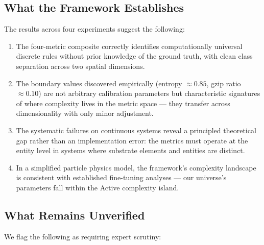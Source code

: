 \documentclass[12pt,a4paper]{article}
\begin{document}
\subsection{What the Framework Establishes}

The results across four experiments suggest the following:

\begin{enumerate}[noitemsep]
  \item The four-metric composite correctly identifies computationally
    universal discrete rules without prior knowledge of the ground truth,
    with clean class separation across two spatial dimensions.
  \item The boundary values discovered empirically (entropy $\approx 0.85$,
    gzip ratio $\approx 0.10$) are not arbitrary calibration parameters
    but characteristic signatures of where complexity lives in the
    metric space — they transfer across dimensionality with only minor
    adjustment.
  \item The systematic failures on continuous systems reveal a principled
    theoretical gap rather than an implementation error: the metrics
    must operate at the entity level in systems where substrate elements
    and entities are distinct.
  \item In a simplified particle physics model, the framework's
    complexity landscape is consistent with established fine-tuning
    analyses \citep{adams2019} — our universe's parameters fall within
    the Active complexity island.
\end{enumerate}

\subsection{What Remains Unverified}

We flag the following as requiring expert scrutiny:
\end{document}
